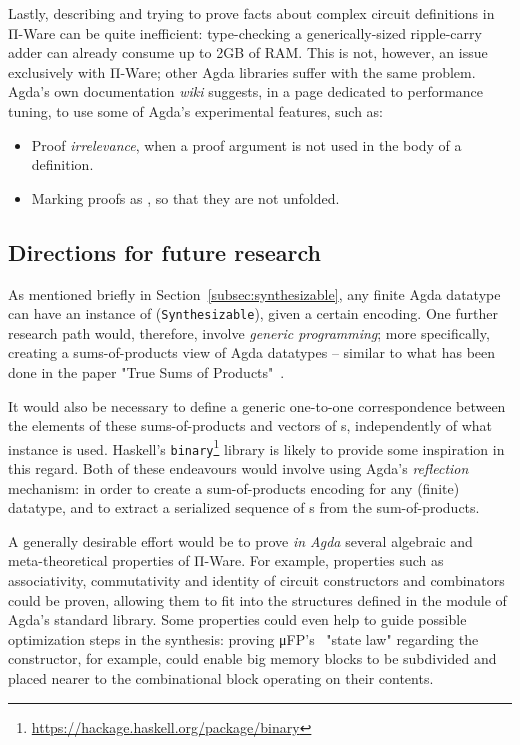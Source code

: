             Lastly, describing and trying to prove facts about complex circuit definitions in Π-Ware
            can be quite inefficient: type-checking a generically-sized ripple-carry adder can already
            consume up to 2GB of RAM.
            This is not, however, an issue exclusively with Π-Ware; other Agda libraries suffer with the same problem.
            Agda's own documentation \emph{wiki} suggests, in a page dedicated to performance tuning,
            to use some of Agda's experimental features, such as:

            \begin{itemize}
                \item Proof \emph{irrelevance}, when a proof argument is not used in the body of a definition.
                \item Marking proofs as , so that they are not unfolded.
            \end{itemize}


        \subsection{Directions for future research}
        \label{subsec:future-research}
            As mentioned briefly in Section~\ref{subsec:synthesizable}, any finite Agda datatype can have
            an instance of  (\texttt{Synthesizable}), given a certain encoding.
            One further research path would, therefore, involve \emph{generic programming};
            more specifically, creating a sums-of-products view of Agda datatypes – similar to
            what has been done in the paper "True Sums of Products"~\cite{true-sop}.

            It would also be necessary to define a generic one-to-one correspondence
            between the elements of these sums-of-products and vectors of s,
            independently of what  instance is used.
            Haskell's \texttt{binary}\footnote{\url{https://hackage.haskell.org/package/binary}}
            library is likely to provide some inspiration in this regard.
            Both of these endeavours would involve using Agda's
            \emph{reflection}~\cite{engineering-reflection-agda} mechanism:
            in order to create a sum-of-products encoding for any (finite) datatype,
            and to extract a serialized sequence of s from the sum-of-products.

            A generally desirable effort would be to prove \emph{in Agda} several
            algebraic and meta-theoretical properties of Π-Ware.
            For example, properties such as associativity, commutativity and identity of
            circuit constructors and combinators could be proven, allowing them to fit into
            the structures defined in the  module of Agda's standard library.
            Some properties could even help to guide possible optimization steps in the synthesis:
            proving μFP's~\cite{mufp-1984} "state law" regarding the  constructor,
            for example, could enable big memory blocks to be subdivided and placed nearer
            to the combinational block operating on their contents.

